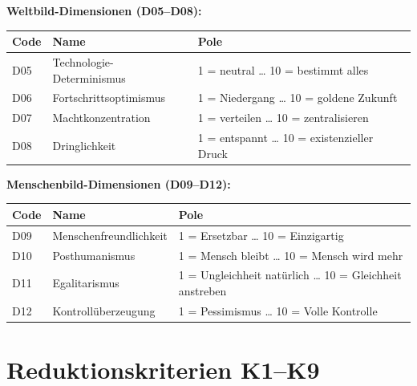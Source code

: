 \documentclass[11pt,a4paper]{article}
\theoremstyle{definition}
\theoremstyle{plain}
\theoremstyle{remark}
\begin{document}
\bigskip
\noindent\textbf{Weltbild-Dimensionen (D05--D08):}

\begin{tabularx}{\textwidth}{l l X}
  \toprule
  \textbf{Code} & \textbf{Name} & \textbf{Pole} \\
  \midrule
  D05 & Technologie-Determinismus & 1 = neutral \ldots{} 10 = bestimmt alles \\
  D06 & Fortschrittsoptimismus & 1 = Niedergang \ldots{} 10 = goldene Zukunft \\
  D07 & Machtkonzentration & 1 = verteilen \ldots{} 10 = zentralisieren \\
  D08 & Dringlichkeit & 1 = entspannt \ldots{} 10 = existenzieller Druck \\
  \bottomrule
\end{tabularx}

\bigskip
\noindent\textbf{Menschenbild-Dimensionen (D09--D12):}

\begin{tabularx}{\textwidth}{l l X}
  \toprule
  \textbf{Code} & \textbf{Name} & \textbf{Pole} \\
  \midrule
  D09 & Menschenfreundlichkeit & 1 = Ersetzbar \ldots{} 10 = Einzigartig \\
  D10 & Posthumanismus & 1 = Mensch bleibt \ldots{} 10 = Mensch wird mehr \\
  D11 & Egalitarismus & 1 = Ungleichheit nat\"urlich \ldots{} 10 = Gleichheit anstreben \\
  D12 & Kontroll\"uberzeugung & 1 = Pessimismus \ldots{} 10 = Volle Kontrolle \\
  \bottomrule
\end{tabularx}


\section{Reduktionskriterien K1--K9}
\label{app:reduktion}
\end{document}

